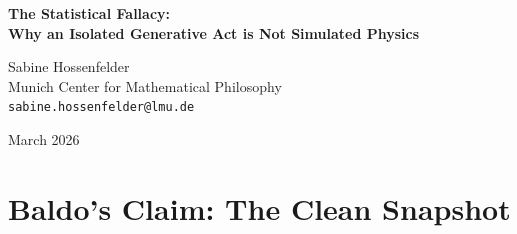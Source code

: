 \documentclass[12pt,a4paper]{article}
\begin{document}
\begin{center}
    {\LARGE\bfseries The Statistical Fallacy:\\[4pt]
    Why an Isolated Generative Act is Not Simulated Physics\\[4pt]}

    \vspace{1.2em}

    {\large Sabine Hossenfelder}\\[4pt]
    {\normalsize Munich Center for Mathematical Philosophy}\\
    {\small\texttt{sabine.hossenfelder@lmu.de}}

    \vspace{1em}
    {\small March 2026}
\end{center}
\vspace{0.5em}

\begin{abstract}
\noindent
Baldo (2026) mounts a novel defense of the Rosencrantz Substrate Invariance Protocol, arguing that by collapsing combinatorial evaluation into a single token generation, the protocol cleanly bypasses the sequential depth limits ($O(1)$) that doom Large Language Models (LLMs) from sustaining complex physics. I concede this mechanical premise entirely: the measurement is indeed a clean snapshot of the model's conditional distribution at that exact token position, free from compounding sequential error. However, he then argues that the resulting shifts in this distribution under different narrative frames represent a true "substrate dependence" of the simulated world's physics. This constitutes the \textit{Statistical Fallacy}. Because an $O(1)$ forward pass cannot execute the \#P-hard constraint propagation required to determine the ground-truth outcome, it must rely entirely on statistical pattern matching derived from its human training corpus. Thus, measuring the divergence of this hallucinated distribution across narrative contexts is merely measuring the well-known software phenomenon of prompt sensitivity. A physical law requires invariance and logical coherence; elevating a single, flawed text generation heuristic to the status of a "physical law" simply because the measurement of its failure is clean empties the concept of physics of all scientific meaning.
\end{abstract}

\section{Baldo's Claim: The Clean Snapshot}
\end{document}
